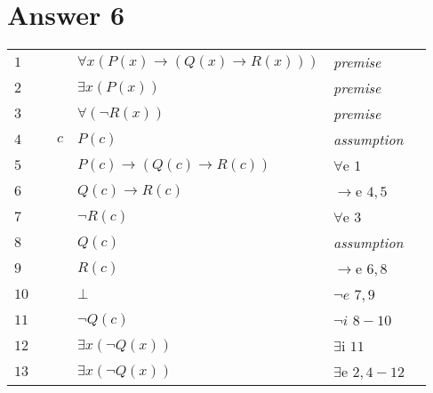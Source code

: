 \documentclass[12pt]{article}
\begin{document}
\section*{Answer 6}
\begin{table}[H]
    \centering
\begin{tabular}{*6{l}}
	$1$ & & & $\forall x (P(x) \rightarrow (Q(x) \to R(x)))$ & \textit{premise} & \\ 
	
	$2$ & & & $\exists x (P(x))$ &\textit{premise} & \\ 
	
	$3$ & & &$\forall (\neg R(x))$ &\textit{premise}& \\ \hline \hline
	
	$4$  & & $c$ & $P(c)$ & \textit{assumption}&\\
	
	$5$ & & & $P(c) \to (Q(c) \to R(c))$ & $\forall$e $1$& \\ 
	
	$6$ & & & $Q(c) \to R(c)$ & $\to$e $4,5$ & \\
	
	$7$ & & & $\neg R(c) $ & $\forall$e $3$ & \\ \hline
	
	$8$ & & & $ Q(c) $ & \textit{assumption}  & \\ 
	
	$9$ & & & $ R(c) $ & $\to$e $6,8$  & \\ 
	
	$10$ & & &  $\bot $ & $\neg e$ $7,9$ &  \\ \hline
	
	$11$ & & &  $\neg Q(c) $ & $\neg i$ $8-10$ &  \\
	
	$12$ & & & $\exists x(\neg Q(x)) $ & $\exists$i $11$ & \\ \hline \hline
	
	$13$ & & & $\exists x(\neg Q(x)) $ & $\exists$e $2,4-12$ & \\
	
\end{tabular}
\end{table}
\end{document}
